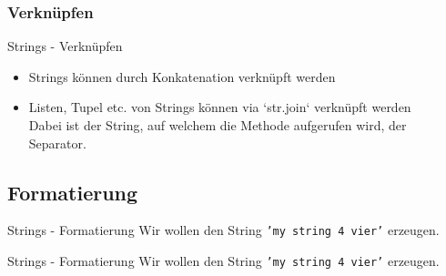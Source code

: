 \subsubsection{Verknüpfen}
\begin{frame}[fragile]{Strings - Verknüpfen}
	\begin{itemize}
	    \item Strings können durch Konkatenation verknüpft werden \\
	    
	    \item Listen, Tupel etc. von Strings können via `str.join` verknüpft werden \\
	    
	    Dabei ist der String, auf welchem die Methode aufgerufen wird, der Separator.
	\end{itemize}
\end{frame}


\subsection{Formatierung}
\begin{frame}[fragile]{Strings - Formatierung}
	Wir wollen den String \alert{\texttt{'my string 4 vier'}} erzeugen.

	
\end{frame}

\begin{frame}[fragile]{Strings - Formatierung}
	Wir wollen den String \alert{\texttt{'my string 4 vier'}} erzeugen.
	
\end{frame}




